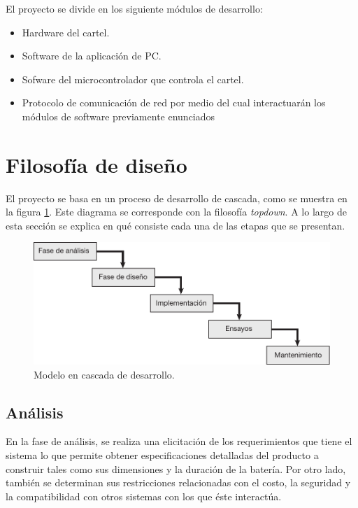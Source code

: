 El proyecto se divide en los siguiente módulos de desarrollo:

\begin{itemize}
	\item Hardware del cartel.
	\item Software de la aplicación de PC.
	\item Sofware del microcontrolador que controla el cartel.
	\item Protocolo de comunicación de red por medio del cual interactuarán los módulos de software previamente enunciados
\end{itemize}


\section{Filosofía de diseño}
El proyecto se basa en un proceso de desarrollo de cascada, como se muestra en la figura \ref{fig:waterfall}. Este diagrama se corresponde con la filosofía \emph{topdown}. A lo largo de esta sección se explica en qué consiste cada una de las etapas que se presentan.

\begin{figure}[!ht]
	\centering
	\includegraphics[width=1\linewidth]{imagenes/waterfall.pdf}
	\caption{Modelo en cascada de desarrollo.}
	\label{fig:waterfall}
\end{figure}


\subsection{Análisis}
En la fase de análisis, se realiza una elicitación de los requerimientos que tiene el sistema lo que permite obtener especificaciones detalladas del producto a construir tales como sus dimensiones y la duración de la batería. Por otro lado, también se determinan sus restricciones relacionadas con el costo, la seguridad y la compatibilidad con otros sistemas con los que éste interactúa.

